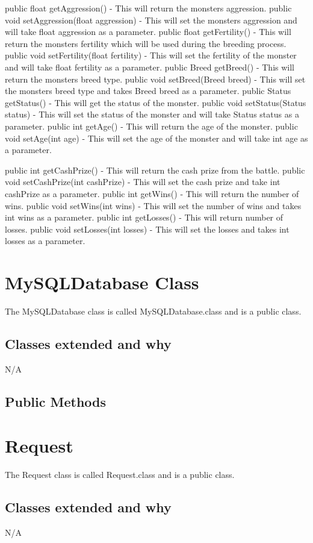 \documentclass{project}
\begin{document}
public float getAggression() - This will return the monsters aggression. public void setAggression(float aggression) - This will set the monsters aggression and will take float aggression as a parameter.
public float getFertility() - This will return the monsters fertility which will be used during the breeding process. public void setFertility(float fertility) - This will set the fertility of the monster and will take float fertility as a parameter.
public Breed getBreed() - This will return the monsters breed type. public void setBreed(Breed breed) - This will set the monsters breed type and takes Breed breed as a parameter.
public Status getStatus() - This will get the status of the monster. public void setStatus(Status status) - This will set the status of the monster and will take Status status as a parameter.
public int getAge() - This will return the age of the monster. public void setAge(int age) - This will set the age of the monster and will take int age as a parameter.

public int getCashPrize() - This will return the cash prize from the battle. public void setCashPrize(int cashPrize) - This will set the cash prize and take int cashPrize as a parameter.
public int getWins() - This will return the number of wins. public void setWins(int wins) - This will set the number of wins and takes int wins as a parameter.
public int getLosses() - This will return number of losses. public void setLosses(int losses) - This will set the losses and takes int losses as a parameter.

\section{MySQLDatabase Class}
The MySQLDatabase class is called MySQLDatabase.class and is a public class.
\subsection{Classes extended and why}
N/A
\subsection{Public Methods}


\section{Request}
The Request class is called Request.class and is a public class.
\subsection{Classes extended and why}
N/A
\end{document}
